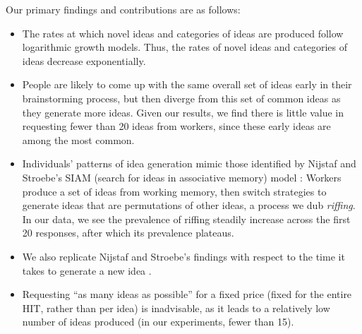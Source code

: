 Our primary findings and contributions are as follows:
\begin{itemize}
\item The rates at which novel ideas and categories of ideas are produced follow logarithmic growth models. Thus, the rates of novel ideas and categories of ideas decrease exponentially.
\item People are likely to come up with the same overall set of ideas early in their brainstorming process, but then diverge from this set of common ideas as they generate more ideas. Given our results, we find there is little value in requesting fewer than 20 ideas from workers, since these early ideas are among the most common.
\item Individuals' patterns of idea generation mimic those identified by Nijstaf and Stroebe's SIAM (search for ideas in associative memory) model \cite{nijstad_how_2006}: Workers produce a set of ideas from working memory, then switch strategies to generate ideas that are permutations of other ideas, a process we dub {\em riffing\/}. In our data, we see the prevalence of riffing steadily increase across the first 20 responses, after which its prevalence plateaus.
\item We also replicate Nijstaf and Stroebe's findings with respect to the time it takes to generate a new idea \cite{nijstaf_how_2006}.
\item Requesting ``as many ideas as possible'' for a fixed price (fixed for the entire HIT, rather than per idea) is inadvisable, as it leads to a relatively low number of ideas produced (in our experiments, fewer than 15).
\end{itemize}

